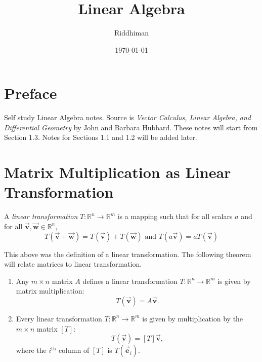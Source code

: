 \documentclass[12pt]{article}
\title{Linear Algebra}
\author{Riddhiman}
\date{\monthyeardate\today}
\theoremstyle{remark}
\let\oldvec = \vec
\renewcommand{\vec}[1]{\oldvec{\mathbf{#1}}}
\numberwithin{equation}{section}
\begin{document}
\maketitle

\section{Preface}%
\label{sec:Preface}
Self study Linear Algebra notes. Source is \textit{Vector Calculus, Linear Algebra, and Differential Geometry} by John and Barbara Hubbard. These notes will start from Section 1.3. Notes for Sections 1.1 and 1.2 will be added later.

\section{Matrix Multiplication as Linear Transformation}%
\label{sec:Matrix Multiplication as Linear Transformation}

\begin{definition}  
	A \textit{linear transformation} $ T : \mathbb{R}^{n} \rightarrow \mathbb{R}^{m} $ is a mapping such that for all scalars $ a $ and for all $ \vec{v}, \vec{w} \in \mathbb{R}^{n} $,
	\begin{equation}
		T(\vec{v} + \vec{w}) = T(\vec{v}) + T(\vec{w}) \text{ and } T(a\vec{v}) = aT(\vec{v})
	\end{equation}	
\end{definition}

This above was the definition of a linear transformation. The following theorem will relate matrices to linear transformation. 

\begin{important}
	\begin{enumerate}
		\item Any $ m \times n $ matrix $ A $ defines a linear transformation $ T : \mathbb{R}^n \rightarrow \mathbb{R}^m $ is given by matrix multiplication: 
			\begin{equation}
				T(\vec{v}) = A \vec{v}.	
			\end{equation}
		\item Every linear transformation $ T : \mathbb{R}^n \rightarrow \mathbb{R}^m $ is given by multiplication by the $ m \times n $ matrix $ [T] $:
			\begin{equation}
				T(\vec{v}) = [T]\vec{v}, 
			\end{equation}
			where the $ i^{\text{th}} $ column of $ [T] $ is $ T(\vec{e}_{i}) $.
	\end{enumerate}
\end{important}
\end{document}

